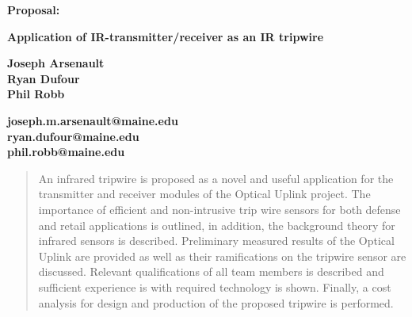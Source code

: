 \documentclass{article}
\begin{document}


\begin{titlepage}
    \begin{center}
        
         \vspace*{1.5cm}
        
         \textbf{{\Huge Proposal: }}
        
         \vspace{0.5cm}
         \textbf{Application of IR-transmitter/receiver as an IR tripwire}
        
          \vspace{.5cm}
        
         \textbf{{\Large Joseph Arsenault \\ Ryan Dufour \\ Phil Robb \newline}}
    \vspace{.4cm}
    	
    	\textbf{joseph.m.arsenault@maine.edu \\ ryan.dufour@maine.edu \\ phil.robb@maine.edu}
    	
    \vspace{1cm}
    
        
        
        \begin{abstract}
        
        
        
        \noindent 
       An infrared tripwire is proposed as a novel and useful application for the transmitter and receiver modules of the Optical Uplink project. The importance of efficient and non-intrusive trip wire sensors for both defense and retail applications is outlined, in addition, the background theory for infrared sensors is described. Preliminary measured results of the Optical Uplink are provided as well as their ramifications on the tripwire sensor are discussed. Relevant qualifications of all team members is described and sufficient experience is with required technology is shown. Finally, a cost analysis for design and production of the proposed tripwire is performed.
        
        
        
        \end{abstract}
        

\end{center}
\end{titlepage}
\end{document}
